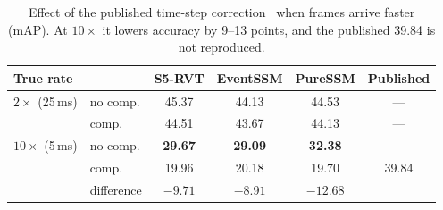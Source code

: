 \documentclass[11pt, a4paper]{report}
\begin{document}
\begin{table}[htbp]
\centering
\caption[Effect of the published time-step correction]{Effect of the published time-step correction~\cite{zubic2024state} when frames arrive faster (mAP). At
    $10\times$ it lowers accuracy by 9--13 points, and the published 39.84 is not reproduced.}
\label{tab:dt_comp}
\begin{tabular}{llcccc}
\toprule
True rate & & \textbf{S5-RVT} & \textbf{EventSSM} & \textbf{PureSSM} & Published \\
\midrule
$2\times$ (25\,ms)  & no comp.  & 45.37 & 44.13 & 44.53 & --- \\
                    & comp.     & 44.51 & 43.67 & 44.13 & --- \\
\midrule
$10\times$ (5\,ms)  & no comp.  & \textbf{29.67} & \textbf{29.09} & \textbf{32.38} & --- \\
                    & comp.     & 19.96 & 20.18 & 19.70 & 39.84 \\
                    & difference & $-9.71$ & $-8.91$ & $-12.68$ & \\
\bottomrule
\end{tabular}
\end{table}
\end{document}
